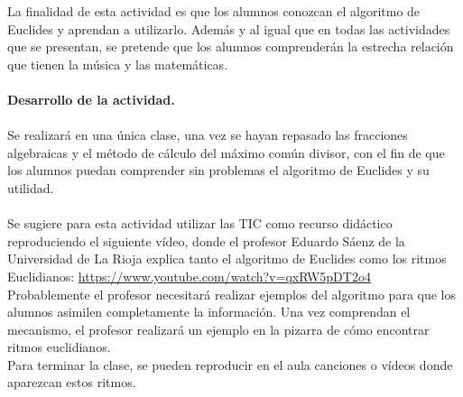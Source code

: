 \documentclass[a4paper, openright, 11pt, titlepage]{report}
\theoremstyle{definition}\newtheorem{defin}[propo]{Definition}
\theoremstyle{definition}\newtheorem{obser}[propo]{Remark}
\theoremstyle{definition}\newtheorem{ejem}[propo]{Ejemplo}
\theoremstyle{definition}\newtheorem{algoritmo}[propo]{Algoritmo}
\begin{document}
\begin{itemize}
    La finalidad de esta actividad es que los alumnos conozcan el algoritmo de Euclides y aprendan a utilizarlo. Además y al igual que en todas las actividades que se presentan, se pretende que los alumnos comprenderán la estrecha relación que tienen la música y las matemáticas.\\\\
    \textbf{Desarrollo de la actividad.}\\\\
    Se realizará en una única clase, una vez se hayan repasado las fracciones algebraicas y el método de cálculo del máximo común divisor, con el fin de que los alumnos puedan comprender sin problemas el algoritmo de Euclides y su utilidad.\\\\
    Se sugiere para esta actividad utilizar las TIC como recurso didáctico reproduciendo el siguiente vídeo, donde el profesor Eduardo Sáenz de la Universidad de La Rioja explica tanto el algoritmo de Euclides como los ritmos Euclidianos: \url{https://www.youtube.com/watch?v=qxRW5pDT2o4}\\
    Probablemente el profesor necesitará realizar ejemplos del algoritmo para que los alumnos asimilen completamente la información. Una vez comprendan el mecanismo, el profesor realizará un ejemplo en la pizarra de cómo encontrar ritmos euclidianos.\\
    Para terminar la clase, se pueden reproducir en el aula canciones o vídeos donde aparezcan estos ritmos. 
\end{itemize}
\end{document}

